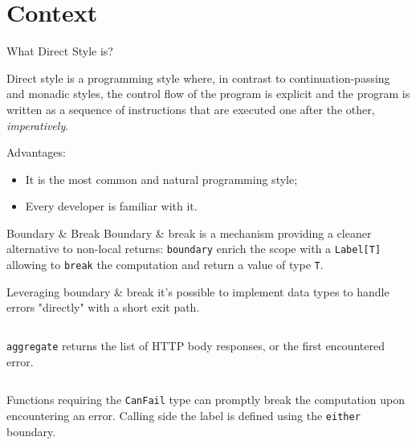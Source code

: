 \documentclass[aspectratio=1610,xcolor=dvipsnames,handout]{beamer}
\begin{document}
\section{Context}
\begin{frame}{What Direct Style is?}
  \begin{block}{}
      Direct style is a programming style where, in contrast to continuation-passing and monadic styles, the control flow of the program is explicit and the program is written as a sequence of instructions that are executed one after the other, \emph{imperatively}.
  \end{block}
  Advantages:
  \begin{itemize}
      \item It is the most common and natural programming style;
      \item Every developer is familiar with it.
  \end{itemize}
\end{frame}
%
\begin{frame}{Boundary \& Break \cite{scalar-gears}}
  Boundary \& break is a mechanism providing a cleaner alternative to non-local returns:
  \texttt{boundary} enrich the scope with a \texttt{Label[T]} allowing to \texttt{break} the computation and return a value of type \texttt{T}.
  
  Leveraging boundary \& break it's possible to implement data types to handle errors "directly" with a short exit path. 
\end{frame}
%
\begin{frame}
  \small
  \begin{columns}
      
      \texttt{aggregate} returns the list of HTTP body responses, or the first encountered error.
  \end{columns}
  \pause
  \begin{columns}
      
      Functions requiring the \texttt{CanFail} type can promptly break the computation upon encountering an error.
      Calling side the label is defined using the \texttt{either} boundary.
  \end{columns}
\end{frame}
%
\end{document}
